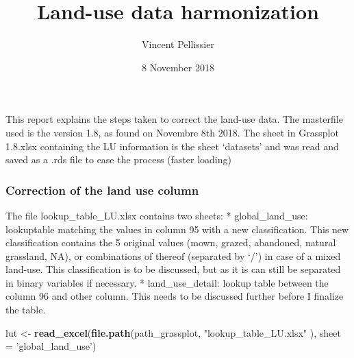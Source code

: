\documentclass[table]{article}
\title{Land-use data harmonization}
\author{Vincent Pellissier}
\date{8 November 2018}
\newenvironment{Shaded}{\begin{snugshade}}{\end{snugshade}}
\newcommand{\KeywordTok}[1]{\textcolor[rgb]{0.13,0.29,0.53}{\textbf{#1}}}
\newcommand{\DataTypeTok}[1]{\textcolor[rgb]{0.13,0.29,0.53}{#1}}
\newcommand{\DecValTok}[1]{\textcolor[rgb]{0.00,0.00,0.81}{#1}}
\newcommand{\StringTok}[1]{\textcolor[rgb]{0.31,0.60,0.02}{#1}}
\newcommand{\OtherTok}[1]{\textcolor[rgb]{0.56,0.35,0.01}{#1}}
\newcommand{\OperatorTok}[1]{\textcolor[rgb]{0.81,0.36,0.00}{\textbf{#1}}}
\newcommand{\NormalTok}[1]{#1}
\begin{document}
\maketitle

This report explains the steps taken to correct the land-use data. The
masterfile used is the version 1.8, as found on Novembre 8th 2018. The
sheet in Grassplot 1.8.xlsx containing the LU information is the sheet
`datasets' and was read and saved as a .rds file to ease the process
(faster loading)

\begin{Shaded}
\end{Shaded}

\subsubsection{Correction of the land use
column}\label{correction-of-the-land-use-column}

The file lookup\_table\_LU.xlsx contains two sheets: *
global\_land\_use: lookuptable matching the values in column 95 with a
new classification. This new classification contains the 5 original
values (mown, grazed, abandoned, natural grassland, NA), or combinations
of thereof (separated by `/') in case of a mixed land-use. This
classification is to be discussed, but as it is can still be separated
in binary variables if necessary. * land\_use\_detail: lookup table
between the column 96 and other column. This needs to be discussed
further before I finalize the table.

\begin{Shaded}
\begin{Highlighting}[]
\NormalTok{lut <-}\StringTok{ }\KeywordTok{read_excel}\NormalTok{(}\KeywordTok{file.path}\NormalTok{(path_grassplot, }\StringTok{"lookup_table_LU.xlsx"}\NormalTok{ ),}
                 \DataTypeTok{sheet =} \StringTok{'global_land_use'}\NormalTok{)}
\end{Highlighting}
\end{Shaded}
\end{document}
